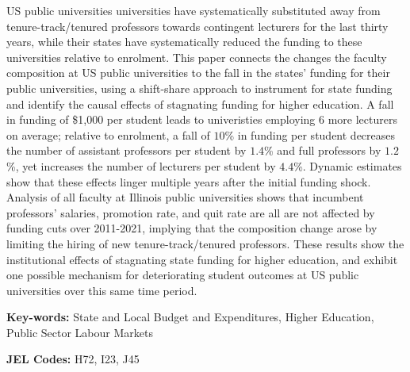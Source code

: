 US public universities universities have systematically substituted away from tenure-track/tenured professors towards contingent lecturers for the last thirty years, while their states have systematically reduced the funding to these universities relative to enrolment.
This paper connects the changes the faculty composition at US public universities to the fall in the states' funding for their public universities, using a shift-share approach to instrument for state funding and identify the causal effects of stagnating funding for higher education.
A fall in funding of \$1,000 per student leads to univeristies employing 6 more lecturers on average; relative to enrolment, a fall of $10$\% in funding per student decreases the number of assistant professors per student by $1.4$\% and full professors by $1.2$\%, yet increases the number of lecturers per student by $4.4$\%.
Dynamic estimates show that these effects linger multiple years after the initial funding shock.
Analysis of all faculty at Illinois public universities shows that incumbent professors' salaries, promotion rate, and quit rate are all are not affected by funding cuts over 2011-2021, implying that the composition change arose by limiting the hiring of new tenure-track/tenured professors.
These results show the institutional effects of stagnating state funding for higher education, and exhibit one possible mechanism for deteriorating student outcomes at US public universities over this same time period.

\vfill
\noindent
\textbf{Key-words:}
State and Local Budget and Expenditures,
Higher Education,
Public Sector Labour Markets

\vspace{0.05cm}
\noindent
\textbf{JEL Codes:} H72, I23, J45
